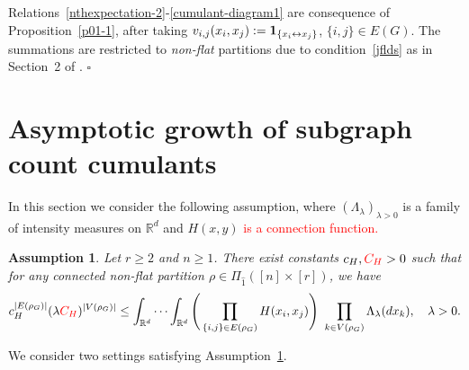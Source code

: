 \documentclass[12pt]{article}
\newcommand{\R}{\mathbb{R}}
\newcommand{\bone}{{\bf 1}}
\newtheorem{assumption}[prop]{Assumption}
\def\real{{\mathord{\mathbb R}}}
\newenvironment{Proof}{\removelastskip\par\medskip
\noindent{\em Proof.} \rm}{\penalty-20\null\hfill$\square$\par\medbreak}
\numberwithin{equation}{section}
\begin{document}
\begin{Proof}
 Relations~\eqref{nthexpectation-2}-\eqref{cumulant-diagram1}
 are consequence of Proposition~\ref{p01-1}, after taking
  $v_{i,j}(x_i,x_j):=\bone_{\{x_i\leftrightarrow x_j\}}$,
  $\{i,j\}\in E(G)$.
  The summations are restricted to {\em non-flat} partitions
  due to condition~\eqref{jflds} as in Section~2 of \cite{prkhp}. 
\end{Proof}
\section{Asymptotic growth of subgraph count cumulants}
\label{s6}
\noindent 
In this section we consider the following assumption,
where $(\Lambda_\lambda)_{\lambda >0}$ is a family 
of intensity measures on $\real^d$ and $H(x,y)$ \textcolor{red}{is
 a connection function.}
\begin{assumption}
\label{a61} 
 Let $r\geq 2$ and $n \geq 1$.
 There exist constants $c_H, \textcolor{red}{C_H} > 0$
 such that 
 for any connected non-flat partition 
 $\rho \in \Pi_{\widehat{1}} ( [n] \times [r])$, we have 
\begin{equation}
\label{integ-connecting3}
  c_H^{|E(\rho_G)|} ( \lambda \textcolor{red}{C_H} )^{|V(\rho_G)|}
\leq     \int_{\R^d}\cdots\int_{\R^d}
\Bigg(
\prod_{\{i,j\}\in E(\rho_G) }H(x_i,x_j)
\Bigg)
\
\prod_{k\in V(\rho_G) } \Lambda_\lambda (dx_k),
\quad \lambda >0. 
\end{equation}
\end{assumption}
 We consider two settings satisfying Assumption~\ref{a61}.

\vspace{-0.8cm}

\end{document}
